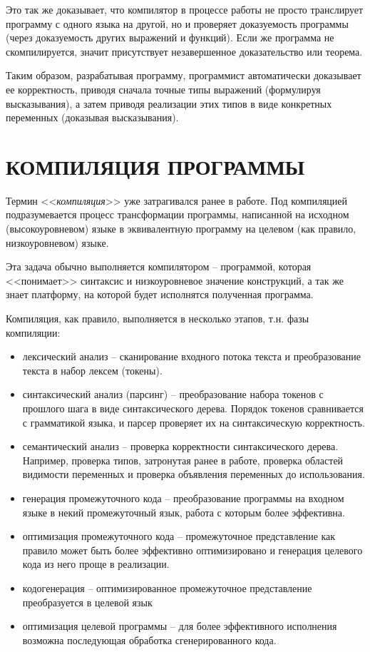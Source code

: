 \documentclass[a4paper,14pt]{extreport} %
\begin{document}
Это так же доказывает, что компилятор в процессе работы не просто транслирует программу с одного языка на другой, но и проверяет доказуемость программы (через доказуемость других выражений и функций). Если же программа не скомпилируется, значит присутствует незавершенное доказательство или теорема.

Таким образом, разрабатывая программу, программист автоматически доказывает ее корректность, приводя сначала точные типы выражений (формулируя высказывания), а затем приводя реализации этих типов в виде конкретных переменных (доказывая высказывания).



\newpage

\section{КОМПИЛЯЦИЯ ПРОГРАММЫ}

Термин <<\textit{компиляция}>> уже затрагивался ранее в работе. Под компиляцией подразумевается процесс трансформации программы, написанной на исходном (высокоуровневом) языке в эквивалентную программу на целевом (как правило, низкоуровневом) языке.

Эта задача обычно выполняется компилятором -- программой, которая <<понимает>> синтаксис и низкоуровневое значение конструкций, а так же знает платформу, на которой будет исполнятся полученная программа.

Компиляция, как правило, выполняется в несколько этапов, т.н. фазы компиляции:
\begin{itemize}
    \item лексический анализ -- сканирование входного потока текста и преобразование текста в набор лексем (токены).
    \item синтаксический анализ (парсинг) -- преобразование набора токенов с прошлого шага в виде синтаксического дерева. Порядок токенов сравнивается с грамматикой языка, и парсер проверяет их на синтаксическую корректность.
    \item семантический анализ -- проверка корректности синтаксического дерева. Например, проверка типов, затронутая ранее в работе, проверка областей видимости переменных и проверка объявления переменных до использования.
    \item генерация промежуточного кода -- преобразование программы на входном языке в некий промежуточный язык, работа с которым более эффективна.
    \item оптимизация промежуточного кода -- промежуточное представление как правило может быть более эффективно оптимизировано и генерация целевого кода из него проще в реализации.
    \item кодогенерация -- оптимизированное промежуточное представление преобразуется в целевой язык
    \item оптимизация целевой программы -- для более эффективного исполнения возможна последующая обработка сгенерированного кода.
\end{itemize}
\end{document}
